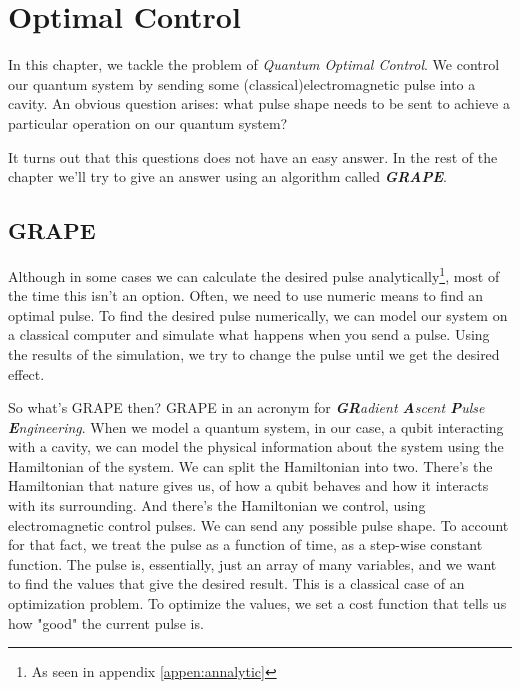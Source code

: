 \chapter{Optimal Control}\label{chap:optimal}

In this chapter, we tackle the problem of \textit{Quantum Optimal Control}. We control our quantum system by sending some (classical)electromagnetic pulse into a cavity. An obvious question arises: what pulse shape needs to be sent to achieve a particular operation on our quantum system? 

It turns out that this questions does not have an easy answer. In the rest of the chapter we'll try to give an answer using an algorithm called \textbf{\textit{GRAPE}}.

\section{GRAPE}
Although in some cases we can calculate the desired pulse analytically\footnote{As seen in appendix \ref{appen:annalytic}}, most of the time this isn't an option. Often, we need to use numeric means to find an optimal pulse. To find the desired pulse numerically, we can model our system on a classical computer and simulate what happens when you send a pulse. Using the results of the simulation, we try to change the pulse until we get the desired effect.

So what's GRAPE then? GRAPE in an acronym for \textit{\textbf{GR}adient \textbf{A}scent \textbf{P}ulse \textbf{E}ngineering}. When we model a quantum system, in our case, a qubit interacting with a cavity, we can model the physical information about the system using the Hamiltonian of the system. We can split the Hamiltonian into two. There's the Hamiltonian that nature gives us, of how a qubit behaves and how it interacts with its surrounding. And there's the Hamiltonian we control, using electromagnetic control pulses. We can send any possible pulse shape. To account for that fact, we treat the pulse as a function of time, as a step-wise constant function. The pulse is, essentially, just an array of many variables, and we want to find the values that give the desired result. This is a classical case of an optimization problem. To optimize the values, we set a cost function that tells us how "good" the current pulse is.

